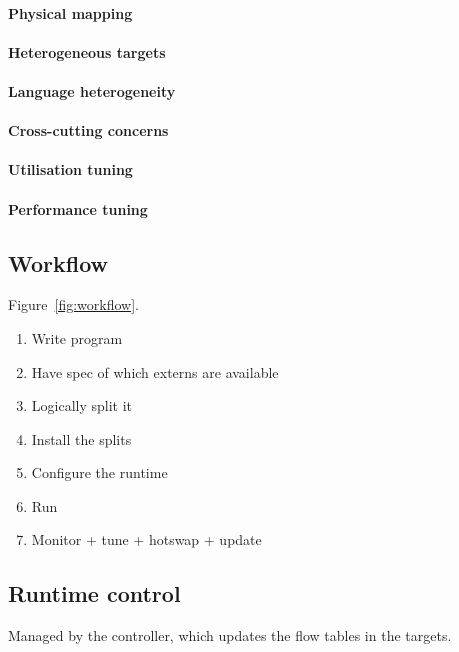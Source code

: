 \documentclass[letterpaper,twocolumn,10pt]{article}
\begin{document}
\paragraph{Physical mapping}
\paragraph{Heterogeneous targets}
\paragraph{Language heterogeneity}
\paragraph{Cross-cutting concerns}
\paragraph{Utilisation tuning}
\paragraph{Performance tuning}


\subsection{Workflow}
Figure~\ref{fig:workflow}.
\begin{enumerate}
\item Write program
\item Have spec of which externs are available
\item Logically split it
\item Install the splits
\item Configure the runtime
\item Run
\item Monitor + tune + hotswap + update
\end{enumerate}


\subsection{Runtime control}
Managed by the controller, which updates the flow tables in the targets.
\end{document}
